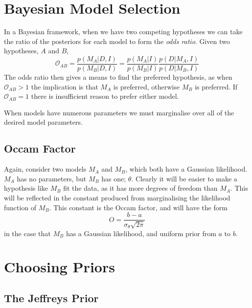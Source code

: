 \documentclass{dwnotes}         		        %
\begin{document}
\section{Bayesian Model Selection}
\label{sec:bayes-model-select}

In a Bayesian framework, when we have two competing hypotheses we can
take the ratio of the posteriors for each model to form the \emph{odds
  ratio}. Given two hypotheses, $A$ and $B$,
\begin{equation}
  \label{eq:8}
  \mathcal{O}_{AB} = \frac{p(M_A|D,I)}{p(M_B | D,I)} = \frac{p(M_A|I)}{p(M_B|I)} \frac{p(D|M_A,I)}{p(D|M_B,I)}
\end{equation}
The odds ratio then gives a means to find the preferred hypothesis, as
when $\mathcal{O}_{AB}>1$ the implication is that $M_A$ is preferred,
otherwise $M_B$ is preferred. If $\mathcal{O}_{AB}=1$ there is
insufficient reason to prefer either model.

When models have numerous parameters we must marginalise over all of
the desired model parameters.

\subsection{Occam Factor}
\label{sec:occam-factor}

Again, consider two models $M_A$ and $M_B$, which both have a Gaussian
likelihood. $M_A$ has no parameters, but $M_B$ has one;
$\theta$. Clearly it will be easier to make a hypothesis like $M_B$
fit the data, as it has more degrees of freedom than $M_A$. This will
be reflected in the constant produced from marginalising the
likelihood function of $M_B$. This constant is the Occam factor, and will have the form
\begin{equation}
  \label{eq:9}
  O = \frac{b-a}{\sigma_{\theta} \sqrt{2 \pi}}
\end{equation}
in the case that $M_B$ has a Gaussian likelihood, and uniform prior
from $a$ to $b$.

\section{Choosing Priors}
\label{sec:choosing-priors}

\subsection{The Jeffreys Prior}
\label{sec:jeffreys-prior}
\end{document}
